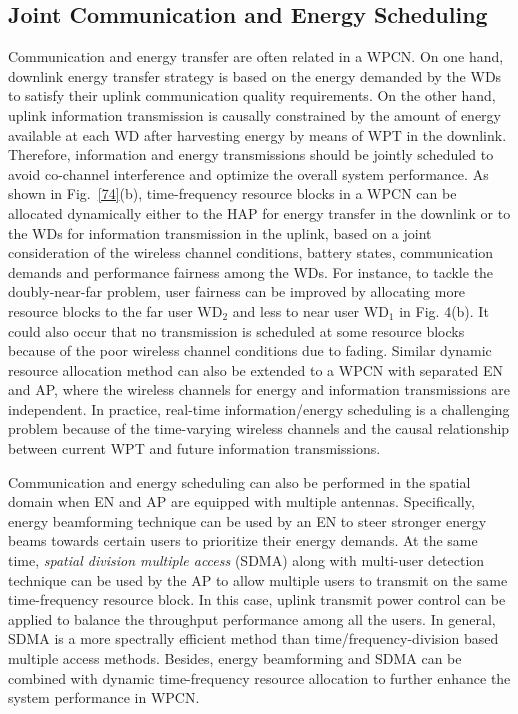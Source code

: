 \documentclass[journal, draftcls, one column, 12pt]{IEEEtran}
\begin{document}
\subsection{Joint Communication and Energy Scheduling}
Communication and energy transfer are often related in a WPCN. On one hand, downlink energy transfer strategy is based on the energy demanded by the WDs to satisfy their uplink communication quality requirements. On the other hand, uplink information transmission is causally constrained by the amount of energy available at each WD after harvesting energy by means of WPT in the downlink. Therefore, information and energy transmissions should be jointly scheduled to avoid co-channel interference and optimize the overall system performance. As shown in Fig.~\ref{74}(b), time-frequency resource blocks in a WPCN can be allocated dynamically either to the HAP for energy transfer in the downlink or to the WDs for information transmission in the uplink, based on a joint consideration of the wireless channel conditions, battery states, communication demands and performance fairness among the WDs. For instance, to tackle the doubly-near-far problem, user fairness can be improved by allocating more resource blocks to the far user WD$_2$ and less to near user WD$_1$ in Fig. 4(b). It could also occur that no transmission is scheduled at some resource blocks because of the poor wireless channel conditions due to fading. Similar dynamic resource allocation method can also be extended to a WPCN with separated EN and AP, where the wireless channels for energy and information transmissions are independent. In practice, real-time information/energy scheduling is a challenging problem because of the time-varying wireless channels and the causal relationship between current WPT and future information transmissions.

Communication and energy scheduling can also be performed in the spatial domain when EN and AP are equipped with multiple antennas\cite{2014:Liu}. Specifically, energy beamforming technique can be used by an EN to steer stronger energy beams towards certain users to prioritize their energy demands. At the same time, \emph{spatial division multiple access} (SDMA) along with multi-user detection technique can be used by the AP to allow multiple users to transmit on the same time-frequency resource block. In this case, uplink transmit power control can be applied to balance the throughput performance among all the users. In general, SDMA is a more spectrally efficient method than time/frequency-division based multiple access methods. Besides, energy beamforming and SDMA can be combined with dynamic time-frequency resource allocation to further enhance the system performance in WPCN.
\end{document}
